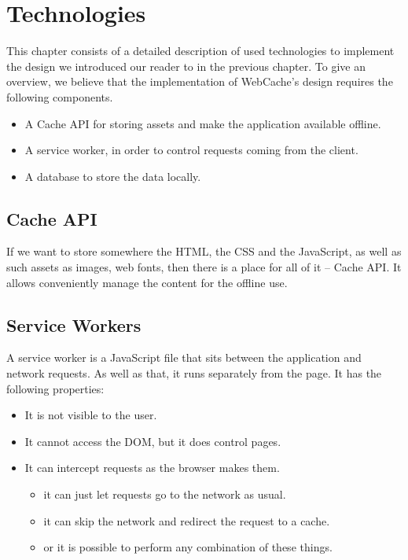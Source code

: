 \chapter{Technologies}
\label{Technologies}

This chapter consists of a detailed description of used technologies to implement the design we introduced our reader to in the previous chapter. To give an overview, we believe that the implementation of WebCache's design requires the following components.

\begin{itemize}
\item{A Cache API for storing assets and make the application available offline.}
\item{A service worker, in order to control requests coming from the client.}
\item{A database to store the data locally}.

\end{itemize}

\section{Cache API}

If we want to store somewhere the HTML, the CSS and the JavaScript, as well as such assets as images, web fonts, then there is a place for all of it -- Cache API. It allows conveniently manage the content for the offline use. 


\section{Service Workers}

A service worker\cite{1} is a JavaScript file that sits between the application and network requests. As well as that, it runs separately from the page. It has the following properties:

\begin{itemize}
\item{It is not visible to the user.}
\item{It cannot access the DOM, but it does control pages.}
\item{It can intercept requests as the browser makes them.}
\begin{itemize}
\item{it can just let requests go to the network as usual.}
\item{it can skip the network and redirect the request to a cache.}
\item{or it is possible to perform any combination of these things.}

\end{itemize}
\end{itemize}

